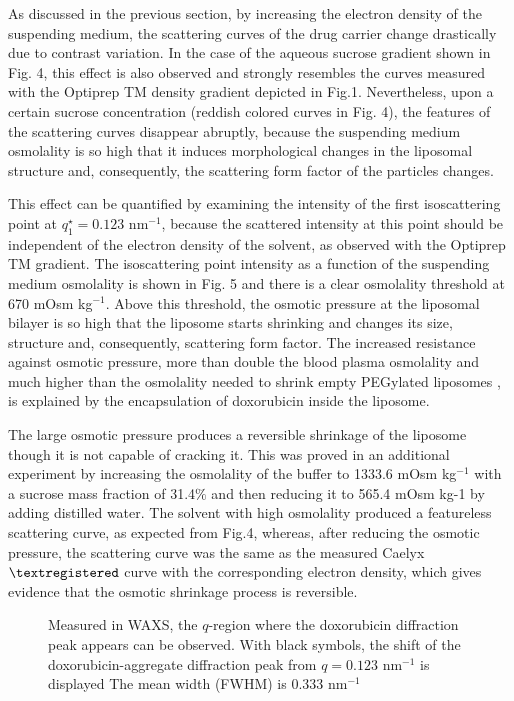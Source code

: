 As discussed in the previous section, by increasing the electron density of the suspending medium, the scattering curves of the drug carrier change drastically due to contrast variation. In the case of the aqueous sucrose gradient shown in Fig. 4, this effect is also observed and strongly resembles the curves measured with the Optiprep TM density gradient depicted in Fig.1. Nevertheless, upon a certain sucrose concentration (reddish colored curves in Fig. 4), the features of the scattering curves disappear abruptly, because the suspending medium osmolality is so high that it induces morphological changes in the liposomal structure and, consequently, the scattering form factor of the particles changes.

This effect can be quantified by examining the intensity of the first isoscattering point at $q^{\star}_1 = 0.123$ nm$^{-1}$, because the scattered intensity at this point should be independent of the electron density of the solvent, as observed with the Optiprep TM gradient. The isoscattering point intensity as a function of the suspending medium osmolality is shown in Fig. 5 and there is a clear osmolality threshold at 670 mOsm kg$^{-1}$. Above this threshold, the osmotic pressure at the liposomal bilayer is so high that the liposome starts shrinking and changes its size, structure and, consequently, scattering form factor. The increased resistance against osmotic pressure, more than double the blood plasma osmolality and much higher than the osmolality needed to shrink empty PEGylated liposomes \cite{varga_osmotic_2014}, is explained by the encapsulation of doxorubicin inside the liposome.

The large osmotic pressure produces a reversible shrinkage of the liposome though it is not capable of cracking it. This was proved in an additional experiment by increasing the osmolality of the buffer to 1333.6 mOsm kg$^{-1}$ with a sucrose mass fraction of 31.4$\%$ and then reducing it to 565.4 mOsm kg-1 by adding distilled water. The solvent with high osmolality produced a featureless scattering curve, as expected from Fig.4, whereas, after reducing the osmotic pressure, the scattering curve was the same as the measured Caelyx$\textregistered$ curve with the corresponding electron density, which gives evidence that the osmotic shrinkage process is reversible.

\begin{figure}
	\centering
		\caption{Measured in WAXS, the $q$-region where the doxorubicin diffraction peak appears can be observed. With black symbols, the shift of the doxorubicin-aggregate diffraction peak from $q=0.123$ nm$^{-1}$ is displayed The mean width (FWHM) is 0.333  nm$^{-1}$}
\end{figure}


